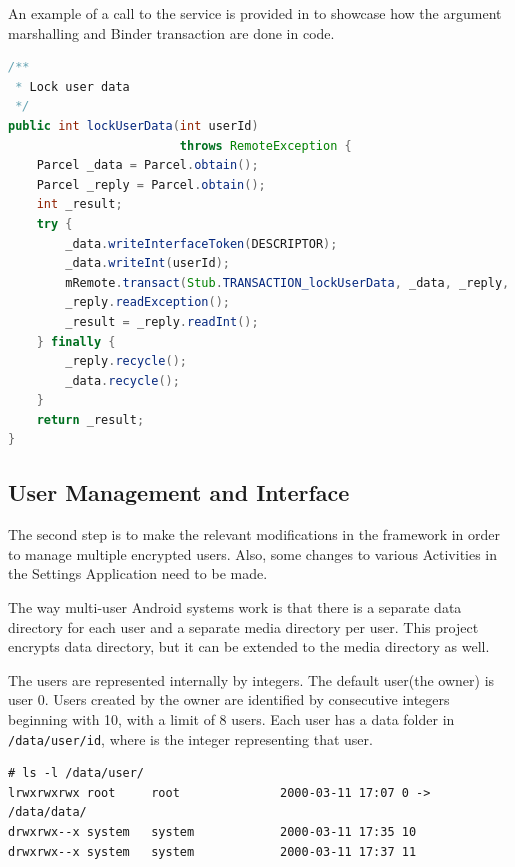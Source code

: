 An example of a call to the service is provided in  to showcase how the argument marshalling and Binder transaction are done in code.

\begin{lstlisting}[language=Java, caption=lockUserData service method, label=lst:lock-user-data-multi-user]
/**
 * Lock user data
 */
public int lockUserData(int userId)
                        throws RemoteException {
	Parcel _data = Parcel.obtain();
	Parcel _reply = Parcel.obtain();
	int _result;
	try {
		_data.writeInterfaceToken(DESCRIPTOR);
		_data.writeInt(userId);
		mRemote.transact(Stub.TRANSACTION_lockUserData, _data, _reply, 0);
		_reply.readException();
		_result = _reply.readInt();
	} finally {
		_reply.recycle();
		_data.recycle();
	}
	return _result;
}
\end{lstlisting}

\subsection{User Management and Interface}
\label{sub-sec:user-mngmt-inter-multi-user}

The second step is to make the relevant modifications in the framework in order to manage multiple encrypted users. Also, some changes to various Activities in the Settings Application need to be made.

The way multi-user Android systems work is that there is a separate data directory for each user and a separate media directory per user. This project encrypts data directory, but it can be extended to the media directory as well.

The users are represented internally by integers. The default user(the owner) is user 0. Users created by the owner are identified by consecutive integers beginning with 10, with a limit of 8 users. Each user has a data folder in \texttt{/data/user/id}, where  is the integer representing that user.

\begin{minipage}{\linewidth}
\begin{lstlisting}[numbers=none, caption=User Data Directories, label=lst:usr-data-multi-user]
# ls -l /data/user/                                             
lrwxrwxrwx root     root              2000-03-11 17:07 0 -> /data/data/
drwxrwx--x system   system            2000-03-11 17:35 10
drwxrwx--x system   system            2000-03-11 17:37 11
\end{lstlisting}
\end{minipage}

